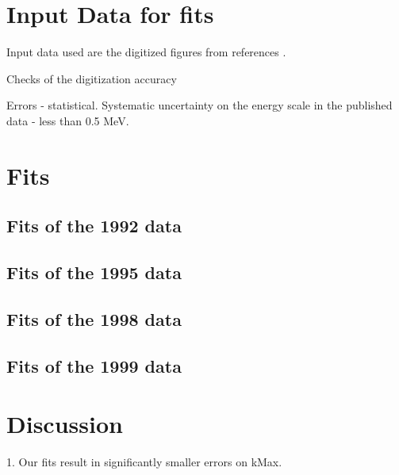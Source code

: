 \documentclass[12pt]{article}
\begin{document}
\section { Input Data for fits}

Input data used are the digitized figures from references
\cite{RMC_1992_PhysRevC.46.1094,RMC_1999_PhysRevC.59.2853}.

Checks of the digitization accuracy

Errors - statistical. Systematic uncertainty on the energy scale in the
published data - less than 0.5 MeV.

\section { Fits }


\subsection { Fits of the 1992 data }

\subsection { Fits of the 1995 data }

\subsection { Fits of the 1998 data }

\subsection { Fits of the 1999 data }

\section { Discussion }


1. Our fits result in significantly smaller errors on kMax.
\end{document}
